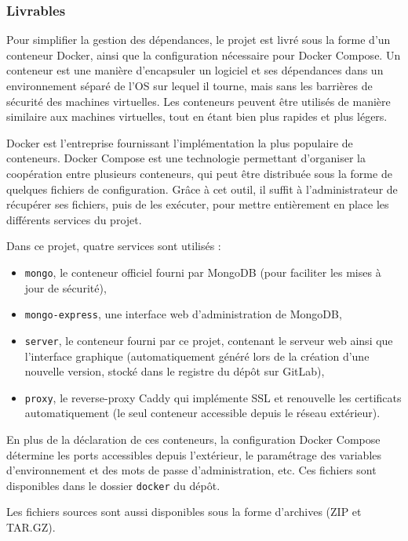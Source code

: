 \documentclass[11pt,french]{memoir}
\begin{document}
	\subsubsection{Livrables}

	Pour simplifier la gestion des dépendances, le projet est livré sous la forme d'un conteneur Docker, ainsi que la configuration nécessaire pour Docker Compose.
	Un conteneur est une manière d'encapsuler un logiciel et ses dépendances dans un environnement séparé de l'OS sur lequel il tourne, mais sans les barrières de sécurité des machines virtuelles.
	Les conteneurs peuvent être utilisés de manière similaire aux machines virtuelles, tout en étant bien plus rapides et plus légers.

	Docker est l'entreprise fournissant l'implémentation la plus populaire de conteneurs.
	Docker Compose est une technologie permettant d'organiser la coopération entre plusieurs conteneurs, qui peut être distribuée sous la forme de quelques fichiers de configuration.
	Grâce à cet outil, il suffit à l'administrateur de récupérer ses fichiers, puis de les exécuter, pour mettre entièrement en place les différents services du projet.

	Dans ce projet, quatre services sont utilisés :
	\begin{itemize}
		\item \lstinline{mongo}, le conteneur officiel fourni par MongoDB (pour faciliter les mises à jour de sécurité),
		\item \lstinline{mongo-express}, une interface web d'administration de MongoDB,
		\item \lstinline{server}, le conteneur fourni par ce projet, contenant le serveur web ainsi que l'interface graphique (automatiquement généré lors de la création d'une nouvelle version, stocké dans le registre du dépôt sur GitLab),
		\item \lstinline{proxy}, le reverse-proxy Caddy qui implémente SSL et renouvelle les certificats automatiquement (le seul conteneur accessible depuis le réseau extérieur).
	\end{itemize}
	En plus de la déclaration de ces conteneurs, la configuration Docker Compose détermine les ports accessibles depuis l'extérieur, le paramétrage des variables d'environnement et des mots de passe d'administration, etc.
	Ces fichiers sont disponibles dans le dossier \lstinline{docker} du dépôt.

	Les fichiers sources sont aussi disponibles sous la forme d'archives (ZIP et TAR.GZ).
\end{document}
